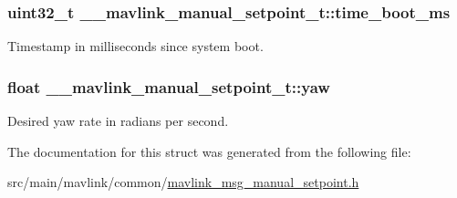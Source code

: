 \hypertarget{struct____mavlink__manual__setpoint__t_aabfde5c1645ed2c5c0e3702cd3b7a63d}{
\subsubsection[{time\+\_\+boot\+\_\+ms}]{\setlength{\rightskip}{0pt plus 5cm}uint32\+\_\+t \+\_\+\+\_\+mavlink\+\_\+manual\+\_\+setpoint\+\_\+t\+::time\+\_\+boot\+\_\+ms}}\label{struct____mavlink__manual__setpoint__t_aabfde5c1645ed2c5c0e3702cd3b7a63d}


Timestamp in milliseconds since system boot. 

\hypertarget{struct____mavlink__manual__setpoint__t_ab3e21184ffcf6b5451f8227d6ccb35bc}{
\subsubsection[{yaw}]{\setlength{\rightskip}{0pt plus 5cm}float \+\_\+\+\_\+mavlink\+\_\+manual\+\_\+setpoint\+\_\+t\+::yaw}}\label{struct____mavlink__manual__setpoint__t_ab3e21184ffcf6b5451f8227d6ccb35bc}


Desired yaw rate in radians per second. 



The documentation for this struct was generated from the following file\+:\begin{DoxyCompactItemize}
\item 
src/main/mavlink/common/\hyperlink{mavlink__msg__manual__setpoint_8h}{mavlink\+\_\+msg\+\_\+manual\+\_\+setpoint.\+h}\end{DoxyCompactItemize}
